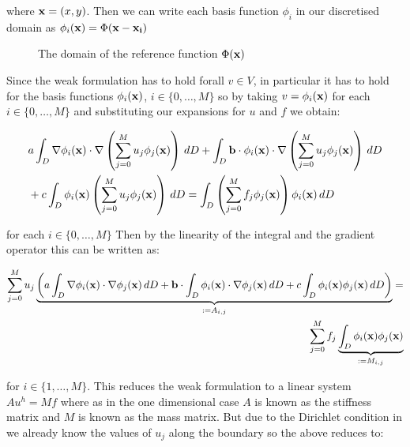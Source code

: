 where $\mathbf{x} = (x, y)$. Then we can write each basis function $\phi_i$ in our
discretised domain as $\phi_i(\mathbf{x}) = \Phi(\mathbf{x} - \mathbf{x_i})$

\begin{figure}
\centering

\caption{The domain of the reference function $\Phi(\mathbf{x})$}
\label{fig:reference-function-domain}
\end{figure}

Since the weak formulation  has to hold forall
$v \in V$, in particular it has to hold for the basis functions
$\phi_i(\mathbf{x})$, $i \in \{0,\ldots,M\}$ so by taking $v = \phi_i(\mathbf{x})$ for
each $i \in \{0, \ldots, M\}$ and substituting our expansions for $u$ and $f$
we obtain:

\begin{align}
\begin{split}
    &a\int_{D}\nabla\phi_i(\mathbf{x}) \cdot
                  \nabla\left(\sum_{j = 0}^Mu_j\phi_j(\mathbf{x})\right)\, dD
    +\int_{D}\mathbf{b}\cdot\phi_i(\mathbf{x})\cdot
                  \nabla\left(\sum_{j = 0}^Mu_j\phi_j(\mathbf{x})\right)\, dD \\
    &+c\int_{D}\phi_i(\mathbf{x})
                    \left(\sum_{j = 0}^Mu_j\phi_j(\mathbf{x})\right)\, dD =
    \int_{D}\left(\sum_{j = 0}^Mf_j\phi_j(\mathbf{x})\right)
                 \phi_i(\mathbf{x})\, dD
\end{split}
\end{align}

for each $i \in \{0, \ldots, M\}$ Then by the linearity of the integral and the
gradient operator this can be written as:

\begin{align}\label{eq:twod-deterministic-discrete}
  \begin{split}
    \sum_{j=0}^Mu_j
      \underbrace{\left(
         a\int_{D}\nabla\phi_i(\mathbf{x})\cdot\nabla\phi_j(\mathbf{x})\, dD
         + \mathbf{b}\cdot\int_{D}\phi_i(\mathbf{x})\cdot\nabla\phi_j(\mathbf{x})\, dD
         +c\int_{D}\phi_i(\mathbf{x})\phi_j(\mathbf{x})\, dD
      \right)}_{:= A_{i,j}} = \\
    \sum_{j=0}^Mf_j
      \underbrace{\int_{D}\phi_i(\mathbf{x})\phi_j(\mathbf{x})}_{:= M_{i,j}}
  \end{split}
\end{align}

for $i \in \{1,\ldots,M\}$. This reduces the weak formulation
 to a linear system $Au^h = Mf$ where as in the
one dimensional case $A$ is known as the stiffness matrix and $M$ is known as
the mass matrix. But due to the Dirichlet condition in
 we already know the values of $u_j$ along the
boundary so the above reduces to:

